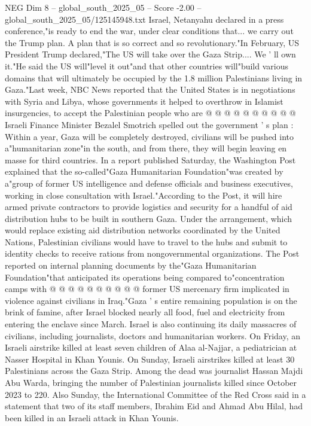 \begin{textsample}{NEG Dim 8 – global\_south\_2025\_05 – Score -2.00 – global\_south\_2025\_05/125145948.txt}
Israel, Netanyahu declared in a press conference,"is ready to end the war, under clear conditions that... we carry out the Trump plan.
A plan that is so correct and so revolutionary."In February, US President Trump declared,"The US will take over the Gaza Strip....
We ' ll own it."He said the US will"level it out"and that other countries will"build various domains that will ultimately be occupied by the 1.8 million Palestinians living in Gaza."Last week, NBC News reported that the United States is in negotiations with Syria and Libya, whose governments it helped to overthrow in Islamist insurgencies, to accept the Palestinian people who are @ @ @ @ @ @ @ @ @ @ Israeli Finance Minister Bezalel Smotrich spelled out the government ' s plan : Within a year, Gaza will be completely destroyed, civilians will be pushed into a"humanitarian zone"in the south, and from there, they will begin leaving en masse for third countries.
In a report published Saturday, the Washington Post explained that the so-called"Gaza Humanitarian Foundation"was created by a"group of former US intelligence and defense officials and business executives, working in close consultation with Israel."According to the Post, it will hire armed private contractors to provide logistics and security for a handful of aid distribution hubs to be built in southern Gaza.
Under the arrangement, which would replace existing aid distribution networks coordinated by the United Nations, Palestinian civilians would have to travel to the hubs and submit to identity checks to receive rations from nongovernmental organizations.
The Post reported on internal planning documents by the"Gaza Humanitarian Foundation"that anticipated its operations being compared to"concentration camps with @ @ @ @ @ @ @ @ @ @ former US mercenary firm implicated in violence against civilians in Iraq."Gaza ' s entire remaining population is on the brink of famine, after Israel blocked nearly all food, fuel and electricity from entering the enclave since March.
Israel is also continuing its daily massacres of civilians, including journalists, doctors and humanitarian workers.
On Friday, an Israeli airstrike killed at least seven children of Alaa al-Najjar, a pediatrician at Nasser Hospital in Khan Younis.
On Sunday, Israeli airstrikes killed at least 30 Palestinians across the Gaza Strip.
Among the dead was journalist Hassan Majdi Abu Warda, bringing the number of Palestinian journalists killed since October 2023 to 220.
Also Sunday, the International Committee of the Red Cross said in a statement that two of its staff members, Ibrahim Eid and Ahmad Abu Hilal, had been killed in an Israeli attack in Khan Younis.

\end{textsample}
